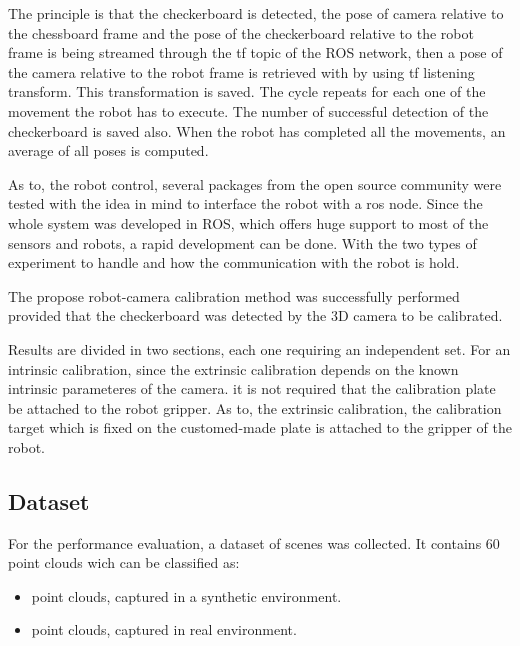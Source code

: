 \iffalse
 The principle is that the checkerboard is detected, the pose of camera relative to the chessboard frame and the pose of the checkerboard relative to the robot frame is being streamed through the tf topic of  the ROS network, then a pose of the camera relative to the robot frame is retrieved with by using tf listening transform. This transformation is saved. The cycle repeats for each one of the movement the robot has to execute. The number of successful detection of the checkerboard is saved also. When the robot has completed all the movements, an average of all poses is computed. 

As to, the robot control, several packages from the open source community were tested with the idea in mind to interface the robot with a ros node.  Since the whole system was developed in ROS, which offers huge support to most of the sensors and robots, a rapid development can be done. 
With the two types of experiment to handle and how the communication with the robot is hold. 



The propose robot-camera calibration method was successfully performed provided that the checkerboard was detected by the 3D camera to be calibrated.


 Results are divided in two sections, each one requiring an independent set. For an intrinsic calibration, since the extrinsic calibration depends on the known intrinsic parameteres of the camera.  it is not required that the calibration plate be attached to the robot gripper. As to, the extrinsic calibration, the calibration target which is fixed on the customed-made plate is attached to the gripper of the robot.

\subsection{Dataset}

For the performance evaluation, a dataset of scenes was collected. It contains 60 point clouds wich can be classified as:
\begin{itemize}
\item point clouds, captured in a synthetic environment.
\item point clouds, captured in real environment. 
\end{itemize}

